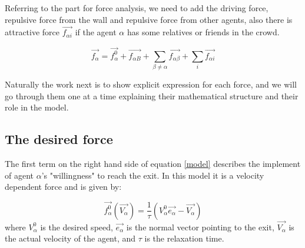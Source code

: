 Referring to the part for force analysis, we need to add the driving force, repulsive force from 
the wall and repulsive force from other agents, also there is attractive force $\vec{f_{\alpha i}}$ 
if the agent $ \alpha $ has some relatives or friends in the crowd.

\begin{equation}\label{model}
    \vec{f_{\alpha}} = \vec{f^{0}_{\alpha}} + \vec{f_{\alpha B}} +
    \sum_{\beta \neq \alpha} \vec{f_{\alpha \beta}} +  
    \sum_{i} \vec{f_{\alpha i}} 
\end{equation}

Naturally the work next is to show explicit expression for each force, and we will go 
through them one at a time explaining their mathematical structure and their role in the model.

\subsection{The desired force} %
The first term on the right hand side of equation \eqref{model} describes the implement of agent 
$ \alpha $'s "willingness" to reach the exit. In this model it is a velocity dependent force 
and is given by:

\begin{equation}\label{relaxtime}
	\vec{f^{0}_{\alpha}}\left( \vec{V_{\alpha}} \right) =
    \frac{1}{\tau}
    \left( V_{\alpha}^{0} \vec{e_{\alpha}} - \vec{V_{\alpha}} \right)
\end{equation}
where $V_{\alpha}^{0}$ is the desired speed, $ \vec{e_{\alpha}} $ is the normal vector pointing 
to the exit, $\vec{V_{\alpha}}$ is the actual velocity of the agent, and $\tau$ is the relaxation time.

